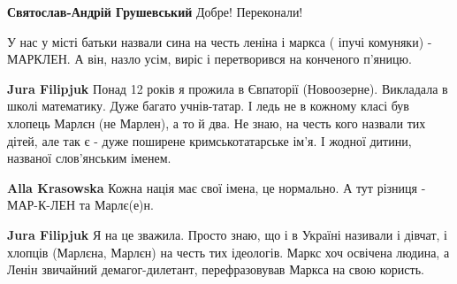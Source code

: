 \begin{itemize}
\begin{itemize}
 
\textbf{Святослав-Андрій Грушевський} Добре! Переконали!

\end{itemize}

 

У нас у місті батьки назвали сина на честь леніна і маркса ( іпучі комуняки) -
МАРКЛЕН. А він, назло усім, виріс і перетворився на конченого п'яницю.

\begin{itemize}
 
\textbf{Jura Filipjuk}
Понад 12 років я прожила в Євпаторії (Новоозерне). Викладала в школі математику. Дуже багато учнів-татар. І ледь не в кожному класі був хлопець Марлєн (не Марлен), а то й два. Не знаю, на честь кого назвали тих дітей, але так є - дуже поширене кримськотатарське ім'я.
І жодної дитини, названої слов'янським іменем.

 
\textbf{Alla Krasowska} Кожна нація має свої імена, це нормально. А тут різниця - МАР-К-ЛЕН та Марлє(е)н.

 
\textbf{Jura Filipjuk}
Я на це зважила.
Просто знаю, що і в Україні називали і дівчат, і хлопців (Марлєна, Марлєн) на честь тих ідеологів.
Маркс хоч освічена людина, а Ленін звичайний демагог-дилетант, перефразовував Маркса на свою користь.
\end{itemize}


\end{itemize}
